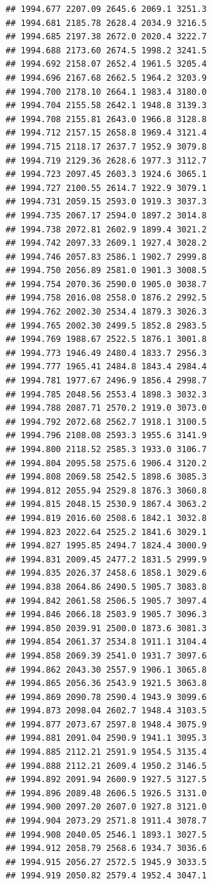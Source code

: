 \documentclass[
]{book}
\begin{document}
\begin{verbatim}
## 1994.677 2207.09 2645.6 2069.1 3251.3
## 1994.681 2185.78 2628.4 2034.9 3216.5
## 1994.685 2197.38 2672.0 2020.4 3222.7
## 1994.688 2173.60 2674.5 1998.2 3241.5
## 1994.692 2158.07 2652.4 1961.5 3205.4
## 1994.696 2167.68 2662.5 1964.2 3203.9
## 1994.700 2178.10 2664.1 1983.4 3180.0
## 1994.704 2155.58 2642.1 1948.8 3139.3
## 1994.708 2155.81 2643.0 1966.8 3128.8
## 1994.712 2157.15 2658.8 1969.4 3121.4
## 1994.715 2118.17 2637.7 1952.9 3079.8
## 1994.719 2129.36 2628.6 1977.3 3112.7
## 1994.723 2097.45 2603.3 1924.6 3065.1
## 1994.727 2100.55 2614.7 1922.9 3079.1
## 1994.731 2059.15 2593.0 1919.3 3037.3
## 1994.735 2067.17 2594.0 1897.2 3014.8
## 1994.738 2072.81 2602.9 1899.4 3021.2
## 1994.742 2097.33 2609.1 1927.4 3028.2
## 1994.746 2057.83 2586.1 1902.7 2999.8
## 1994.750 2056.89 2581.0 1901.3 3008.5
## 1994.754 2070.36 2590.0 1905.0 3038.7
## 1994.758 2016.08 2558.0 1876.2 2992.5
## 1994.762 2002.30 2534.4 1879.3 3026.3
## 1994.765 2002.30 2499.5 1852.8 2983.5
## 1994.769 1988.67 2522.5 1876.1 3001.8
## 1994.773 1946.49 2480.4 1833.7 2956.3
## 1994.777 1965.41 2484.8 1843.4 2984.4
## 1994.781 1977.67 2496.9 1856.4 2998.7
## 1994.785 2048.56 2553.4 1898.3 3032.3
## 1994.788 2087.71 2570.2 1919.0 3073.0
## 1994.792 2072.68 2562.7 1918.1 3100.5
## 1994.796 2108.08 2593.3 1955.6 3141.9
## 1994.800 2118.52 2585.3 1933.0 3106.7
## 1994.804 2095.58 2575.6 1906.4 3120.2
## 1994.808 2069.58 2542.5 1898.6 3085.3
## 1994.812 2055.94 2529.8 1876.3 3060.8
## 1994.815 2048.15 2530.9 1867.4 3063.2
## 1994.819 2016.60 2508.6 1842.1 3032.8
## 1994.823 2022.64 2525.2 1841.6 3029.1
## 1994.827 1995.85 2494.7 1824.4 3000.9
## 1994.831 2009.45 2477.2 1831.5 2999.9
## 1994.835 2026.37 2458.6 1858.1 3029.6
## 1994.838 2064.86 2490.5 1905.7 3083.8
## 1994.842 2061.58 2506.5 1905.7 3097.4
## 1994.846 2066.18 2503.9 1905.7 3096.3
## 1994.850 2039.91 2500.0 1873.6 3081.3
## 1994.854 2061.37 2534.8 1911.1 3104.4
## 1994.858 2069.39 2541.0 1931.7 3097.6
## 1994.862 2043.30 2557.9 1906.1 3065.8
## 1994.865 2056.36 2543.9 1921.5 3063.8
## 1994.869 2090.78 2590.4 1943.9 3099.6
## 1994.873 2098.04 2602.7 1948.4 3103.5
## 1994.877 2073.67 2597.8 1948.4 3075.9
## 1994.881 2091.04 2590.9 1941.1 3095.3
## 1994.885 2112.21 2591.9 1954.5 3135.4
## 1994.888 2112.21 2609.4 1950.2 3146.5
## 1994.892 2091.94 2600.9 1927.5 3127.5
## 1994.896 2089.48 2606.5 1926.5 3131.0
## 1994.900 2097.20 2607.0 1927.8 3121.0
## 1994.904 2073.29 2571.8 1911.4 3078.7
## 1994.908 2040.05 2546.1 1893.1 3027.5
## 1994.912 2058.79 2568.6 1934.7 3036.6
## 1994.915 2056.27 2572.5 1945.9 3033.5
## 1994.919 2050.82 2579.4 1952.4 3047.1

\end{verbatim}
\end{document}
